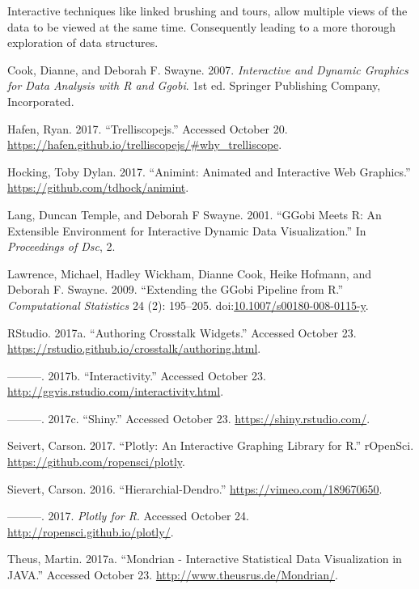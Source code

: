 \documentclass[]{book}
\theoremstyle{definition}
\theoremstyle{definition}
\theoremstyle{definition}
\theoremstyle{remark}
\begin{document}
\begin{boxed}
Interactive techniques like linked brushing and tours, allow multiple
views of the data to be viewed at the same time. Consequently leading to
a more thorough exploration of data structures.
\end{boxed}

\hypertarget{refs}{}
\hypertarget{ref-Cook}{}
Cook, Dianne, and Deborah F. Swayne. 2007. \emph{Interactive and Dynamic
Graphics for Data Analysis with R and Ggobi}. 1st ed. Springer
Publishing Company, Incorporated.

\hypertarget{ref-trelliscope}{}
Hafen, Ryan. 2017. ``Trelliscopejs.'' Accessed October 20.
\url{https://hafen.github.io/trelliscopejs/\#why_trelliscope}.

\hypertarget{ref-animint}{}
Hocking, Toby Dylan. 2017. ``Animint: Animated and Interactive Web
Graphics.'' \url{https://github.com/tdhock/animint}.

\hypertarget{ref-Lang}{}
Lang, Duncan Temple, and Deborah F Swayne. 2001. ``GGobi Meets R: An
Extensible Environment for Interactive Dynamic Data Visualization.'' In
\emph{Proceedings of Dsc}, 2.

\hypertarget{ref-Lawrence}{}
Lawrence, Michael, Hadley Wickham, Dianne Cook, Heike Hofmann, and
Deborah F. Swayne. 2009. ``Extending the GGobi Pipeline from R.''
\emph{Computational Statistics} 24 (2): 195--205.
doi:\href{https://doi.org/10.1007/s00180-008-0115-y}{10.1007/s00180-008-0115-y}.

\hypertarget{ref-crosstalk}{}
RStudio. 2017a. ``Authoring Crosstalk Widgets.'' Accessed October 23.
\url{https://rstudio.github.io/crosstalk/authoring.html}.

\hypertarget{ref-ggvis}{}
---------. 2017b. ``Interactivity.'' Accessed October 23.
\url{http://ggvis.rstudio.com/interactivity.html}.

\hypertarget{ref-shiny}{}
---------. 2017c. ``Shiny.'' Accessed October 23.
\url{https://shiny.rstudio.com/}.

\hypertarget{ref-plotly}{}
Seivert, Carson. 2017. ``Plotly: An Interactive Graphing Library for
R.'' rOpenSci. \url{https://github.com/ropensci/plotly}.

\hypertarget{ref-dendro}{}
Sievert, Carson. 2016. ``Hierarchial-Dendro.''
\url{https://vimeo.com/189670650}.

\hypertarget{ref-plotlyBook}{}
---------. 2017. \emph{Plotly for R}. Accessed October 24.
\url{http://ropensci.github.io/plotly/}.

\hypertarget{ref-mondrian}{}
Theus, Martin. 2017a. ``Mondrian - Interactive Statistical Data
Visualization in JAVA.'' Accessed October 23.
\url{http://www.theusrus.de/Mondrian/}.
\end{document}
